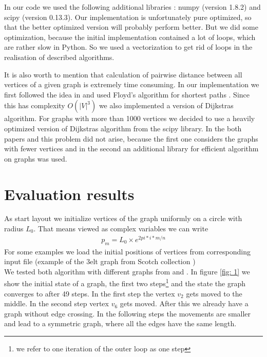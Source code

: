 \documentclass[12pt,a4paper]{article}
\begin{document}
In our code we used the following additional libraries : numpy (version 1.8.2) and scipy (version 0.13.3). Our implementation is unfortunately pure optimized, so that the better optimized version will probably perform better. But we did some optimization, because the initial implementation contained a lot of loops, which are rather slow in Python. So we used a vectorization to get rid of loops in the realisation of described algorithms.

It is also worth to mention that calculation of pairwise distance between all vertices of a given graph is extremely time consuming. In our implementation we first followed the idea in \cite{TomihisaKamada1989} and used Floyd's algorithm for shortest paths \cite{Floyd1962}. Since this has complexity $ O(|V|^3)$ we also implemented a version of Dijkstras algorithm. For graphs with more than 1000 vertices we decided to use a heavily optimized version of Dijkstras algorithm from the scipy library. In the both papers \cite{TomihisaKamada1989} and \cite{DavidHarel2002} this problem did not arise, because the first one considers the graphs with fewer vertices and in the second an additional library for efficient algorithm on graphs was used.

\section{Evaluation results}

As start layout we initialize vertices of the graph uniformly on a circle with radius $L_0$. That means viewed as complex variables we can write 
\begin{align*}
p_m =L_0 \times e^{2 pi*i*m /n}
\end{align*}
For some examples we load the initial positions of vertices from corresponding input file (example of the 3elt graph from Scotch collection \cite{JordiPetit})\\

We tested both algorithm with different graphs from \cite{TomihisaKamada1989} and \cite{DavidHarel2002}. In figure \ref{fig: 1} we show the initial state of a graph, the first two steps\footnote{we refer to one iteration of the outer loop as one step}  and the state the graph converges to after 49 steps. In the first step the vertex $v_2$ gets moved to the middle. In the second step vertex $v_6$ gets moved. After this we already have a graph without edge crossing. In the following steps the movements are smaller and lead to a symmetric graph, where all the edges have the same length.
\end{document}
